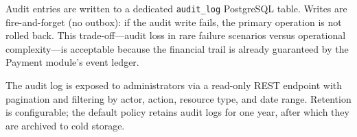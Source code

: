 Audit entries are written to a dedicated \texttt{audit\_log} PostgreSQL table. Writes are fire-and-forget (no outbox): if the audit write fails, the primary operation is not rolled back. This trade-off---audit loss in rare failure scenarios versus operational complexity---is acceptable because the financial trail is already guaranteed by the Payment module's event ledger.

The audit log is exposed to administrators via a read-only REST endpoint with pagination and filtering by actor, action, resource type, and date range. Retention is configurable; the default policy retains audit logs for one year, after which they are archived to cold storage.
